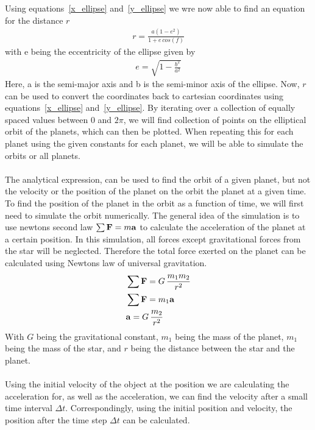 \documentclass[reprint,english,notitlepage]{revtex4-2}
\begin{document}
Using equations~\ref{x_ellipse} and~\ref{y_ellipse} we wre now able to find an equation for the distance $r$
\begin{align*}
    r = \frac{a(1-e^2)}{1 + e\,cos(f)}
\end{align*}
with e being the eccentricity of the ellipse given by 
\begin{align*}
    e = \sqrt{1-\frac{b^2}{a^2}}
\end{align*}
Here, a is the semi-major axis and b is the semi-minor axis of the ellipse.
Now, $r$ can be used to convert the coordinates back to cartesian coordinates using equations~\ref{x_ellipse} and~\ref{y_ellipse}.
By iterating over a collection of equally spaced values between $0$ and $2\pi$, we will find collection of points on the elliptical orbit of the planets, which can then be plotted.
When repeating this for each planet using the given constants for each planet, we will be able to simulate the orbits or all planets.\\\\
The analytical expression, can be used to find the orbit of a given planet, but not the velocity or the position of the planet on the orbit the planet at a given time.
To find the position of the planet in the orbit as a function of time, we will first need to simulate the orbit numerically.
The general idea of the simulation is to use newtons second law $\sum\bold{F} = m\bold{a}$ to calculate the acceleration of the planet at a certain position.
In this simulation, all forces except gravitational forces from the star will be neglected.
Therefore the total force exerted on the planet can be calculated using Newtons law of universal gravitation.
\begin{align*}
    &\sum\bold{F} = G\,\frac{m_1 m_2}{r^2} \label{Newton_Grav_law}\\
	&\sum\bold{F} = m_1 \bold{a}\\
	&\bold{a} = G\,\frac{m_2}{r^2}
\end{align*}
With $G$ being the gravitational constant, $m_1$ being the mass of the planet,  $m_1$ being the mass of the star, and $r$ being the distance between the star and the planet.\\\\
Using the initial velocity of the object at the position we are calculating the acceleration for, as well as the acceleration, we can find the velocity after a small time interval $\Delta t$.
Correspondingly, using the initial position and velocity, the position after the time step $\Delta t$ can be calculated.
\end{document}

